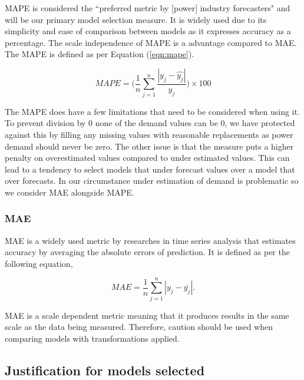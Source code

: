 \documentclass[11pt]{article}
\begin{document}
MAPE is considered the ``preferred metric by [power] industry forecasters" \citep{kotillova_statistical_2012} and will be our primary model selection measure. It is widely used due to its simplicity and ease of comparison between models as it expresses accuracy as a percentage. The scale independence of MAPE is a advantage compared to MAE. The MAPE is defined as per Equation (\ref{eqn:mape}).

\begin{equation}
\label{eqn:mape}
MAPE = \Big(\frac{1}{n} \sum_{j=1}^{n} \frac{|y_j - \hat{y_j} |}{y_j} \Big) \times 100
\end{equation}

\noindent The MAPE does have a few limitations that need to be considered when using it. To prevent division by 0 none of the demand values can be 0, we have protected against this by filling any missing values with reasonable replacements as power demand should never be zero. The other issue is that the measure puts a higher penalty on overestimated values compared to under estimated values. This can lead to a tendency to select models that under forecast values over a model that over forecasts. In our circumstance under estimation of demand is problematic so we consider MAE alongside MAPE.

\subsubsection{MAE}

MAE is a widely used metric by researches in time series analysis that estimates accuracy by averaging the absolute errors of prediction. It is defined as per the following equation,

\begin{equation}
\label{eqn:MAE}
MAE = \frac{1}{n} \sum_{j=1}^{n} |y_j - \bar{y_j} |.
\end{equation}

\noindent MAE is a scale dependent metric meaning that it produces results in the same scale as the data being measured. Therefore, caution should be used when comparing models with transformations applied. 




\subsection{Justification for models selected}
\end{document}
